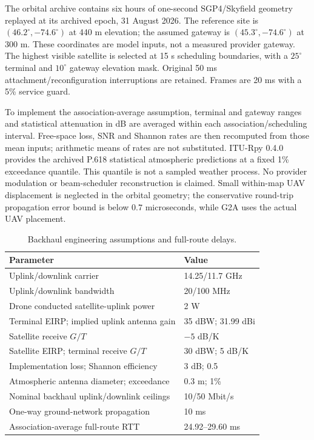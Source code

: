 The orbital archive contains six hours of one-second SGP4/Skyfield geometry replayed at its archived epoch, 31 August 2026. The reference site is $(46.2^{\circ},-74.6^{\circ})$ at 440 m elevation; the assumed gateway is $(45.3^{\circ},-74.6^{\circ})$ at 300 m. These coordinates are model inputs, not a measured provider gateway. The highest visible satellite is selected at 15 s scheduling boundaries, with a $25^{\circ}$ terminal and $10^{\circ}$ gateway elevation mask. Original 50 ms attachment/reconfiguration interruptions are retained. Frames are 20 ms with a 5\% service guard.

To implement the association-average assumption, terminal and gateway ranges and statistical attenuation in dB are averaged within each association/scheduling interval. Free-space loss, SNR and Shannon rates are then recomputed from those mean inputs; arithmetic means of rates are not substituted. ITU-Rpy 0.4.0 provides the archived P.618 statistical atmospheric predictions \cite{iturP618} at a fixed 1\% exceedance quantile. This quantile is not a sampled weather process. No provider modulation or beam-scheduler reconstruction is claimed. Small within-map UAV displacement is neglected in the orbital geometry; the conservative round-trip propagation error bound is below $0.7$ microseconds, while G2A uses the actual UAV placement.

\begin{table}[t]
\centering\caption{Backhaul engineering assumptions and full-route delays.}
\label{tab:backhaul_parameters}\scriptsize
\begin{tabular}{@{}p{}p{}@{}}
\toprule Parameter & Value\\\midrule
Uplink/downlink carrier & 14.25/11.7 GHz\\
Uplink/downlink bandwidth & 20/100 MHz\\
Drone conducted satellite-uplink power & 2 W\\
Terminal EIRP; implied uplink antenna gain & 35 dBW; 31.99 dBi\\
Satellite receive $G/T$ & $-5$ dB/K\\
Satellite EIRP; terminal receive $G/T$ & 30 dBW; 5 dB/K\\
Implementation loss; Shannon efficiency & 3 dB; 0.5\\
Atmospheric antenna diameter; exceedance & 0.3 m; 1\%\\
Nominal backhaul uplink/downlink ceilings & 10/50 Mbit/s\\
One-way ground-network propagation & 10 ms\\
Association-average full-route RTT & 24.92--29.60 ms\\\bottomrule
\end{tabular}
\end{table}

